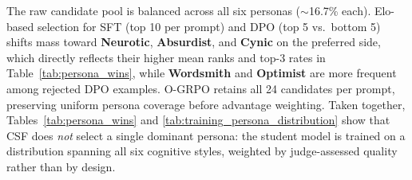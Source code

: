 \documentclass[11pt]{article}
\begin{document}
The raw candidate pool is balanced across all six personas ($\sim$16.7\% each). Elo-based selection for SFT (top 10 per prompt) and DPO (top 5 vs.\ bottom 5) shifts mass toward \textbf{Neurotic}, \textbf{Absurdist}, and \textbf{Cynic} on the preferred side, which directly reflects their higher mean ranks and top-3 rates in Table~\ref{tab:persona_wins}, while \textbf{Wordsmith} and \textbf{Optimist} are more frequent among rejected DPO examples. O-GRPO retains all 24 candidates per prompt, preserving uniform persona coverage before advantage weighting. Taken together, Tables~\ref{tab:persona_wins} and \ref{tab:training_persona_distribution} show that CSF does \textit{not} select a single dominant persona: the student model is trained on a distribution spanning all six cognitive styles, weighted by judge-assessed quality rather than by design.

\begin{table}[H]
\centering
\small
\caption{Persona composition of the alignment training corpora. Counts are followed by row percentages within each column (each column sums to 100\%). All six personas appear in every corpus.}
\label{tab:training_persona_distribution}
\end{table}
\end{document}
